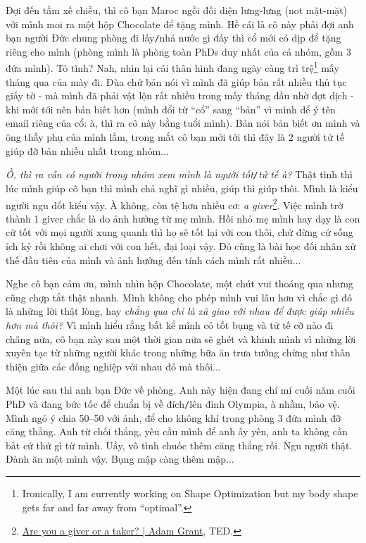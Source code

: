\documentclass[12pt]{article}
\begin{document}
Đợi đến tầm xế chiều, thì cô bạn Maroc ngồi đối diện lưng-lưng (not mặt-mặt) với mình moi ra một hộp Chocolate để tặng mình. Hề cái là cô này phải đợi anh bạn người Đức chung phòng đi lấy{\tt/}nhả nước gì đấy thì cổ mới có dịp để tặng riêng cho mình (phòng mình là phòng toàn PhDs duy nhất của cả nhóm, gồm 3 đứa mình). Tỏ tình? Nah, nhìn lại cái thân hình đang ngày càng trì trệ\footnote{Ironically, I am currently working on Shape Optimization but my body shape gets far and far away from ``optimal''.} mấy tháng qua của mày đi. Đùa chứ bản nói vì mình đã giúp bản rất nhiều thủ tục giấy tờ - mà mình đã phải vật lộn rất nhiều trong mấy tháng đầu nhờ đợt dịch - khi mới tới nên bản biết hơn (mình đổi từ ``cổ'' sang ``bản'' vì mình để ý tên email riêng của cổ: à, thì ra cô này bằng tuổi mình). Bản nói bản biết ơn mình và ông thầy phụ của mình lắm, trong mắt cô bạn mới tới thì đây là 2 người tử tế giúp đỡ bản nhiều nhất trong nhóm$\ldots$

{\it Ồ, thì ra vẫn có người trong nhóm xem mình là người tốt{\tt/}tử tế à?} Thật tình thì lúc mình giúp cô bạn thì mình chả nghĩ gì nhiều, giúp thì giúp thôi. Mình là kiểu người ngu dốt kiểu vậy. À không, còn tệ hơn nhiều cơ: {\it a giver}\footnote{\href{https://www.youtube.com/watch?v=YyXRYgjQXX0}{Are you a giver or a taker? | Adam Grant}, TED.}. Việc mình trở thành 1 giver chắc là do ảnh hưởng từ mẹ mình. Hồi nhỏ mẹ mình hay dạy là con cứ tốt với mọi người xung quanh thì họ sẽ tốt lại với con thôi, chứ đừng cứ sống ích kỷ rồi không ai chơi với con hết, đại loại vậy. Đó cũng là bài học đối nhân xử thế đầu tiên của mình và ảnh hưởng đến tính cách mình rất nhiều$\ldots$

Nghe cô bạn cảm ơn, mình nhìn hộp Chocolate, một chút vui thoáng qua nhưng cũng chợp tắt thật nhanh. Mình không cho phép mình vui lâu hơn vì chắc gì đó là những lời thật lòng, hay {\it chẳng qua chỉ là xã giao với nhau để được giúp nhiều hơn mà thôi?} Vì mình hiểu rằng bất kể mình có tốt bụng và tử tế cỡ nào đi chăng nữa, cô bạn này sau một thời gian nữa sẽ ghét và khinh mình vì những lời xuyên tạc từ những người khác trong những bữa ăn trưa tưởng chừng như thân thiện giữa các đồng nghiệp với nhau đó mà thôi$\ldots$

Một lúc sau thì anh bạn Đức về phòng. Anh này hiện đang chí mí cuối năm cuối PhD và đang bức tốc để chuẩn bị về đích{\tt/}lên đỉnh Olympia, à nhầm, bảo vệ. Mình ngỏ ý chia 50--50 với ảnh, để cho không khí trong phòng 3 đứa mình đỡ căng thẳng. Anh từ chối thẳng, yêu cầu mình để anh ấy yên, anh ta không cần bất cứ thứ gì từ mình. Uầy, vô tình chuốc thêm căng thẳng rồi. Ngu người thật. Đành ăn một mình vậy. Bụng mập càng thêm mập$\ldots$
\end{document}

